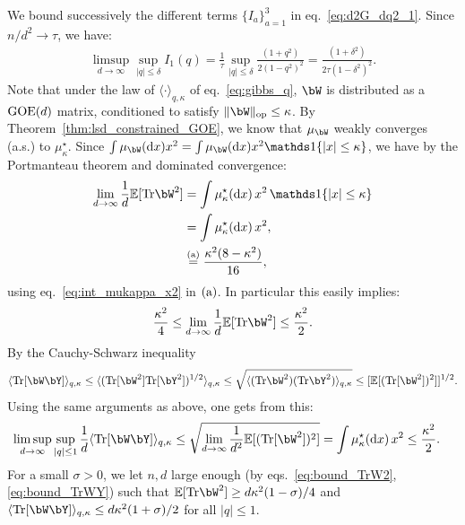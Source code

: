 We bound successively the different terms $\{I_a\}_{a=1}^3$ in eq.~\eqref{eq:d2G_dq2_1}. 
Since $n/d^2 \to \tau$, we have:
\begin{align}\label{eq:ub_I1}
   \limsup_{d \to \infty}\sup_{|q| \leq \delta} I_1(q) = \frac{1}{\tau} \sup_{|q| \leq \delta }\frac{(1+q^2)}{2(1-q^2)^2} 
    = \frac{(1+\delta^2)}{2 \tau(1-\delta^2)^2}.
\end{align}
Note that under the law of $\langle \cdot \rangle_{q,\kappa}$ of eq.~\eqref{eq:gibbs_q},
$\bW$ is distributed as a $\mathrm{GOE}(d)$ matrix, conditioned to satisfy $\|\bW\|_\op \leq \kappa$.
By Theorem~\ref{thm:lsd_constrained_GOE}, we know that $\mu_\bW$ weakly converges (a.s.) to $\mu_\kappa^\star$.
Since $\int \mu_\bW(\rd x) x^2 = \int \mu_\bW(\rd x) x^2 \indi\{|x| \leq \kappa\}$, we have by the Portmanteau theorem 
and dominated convergence: 
\begin{align*}
    \lim_{d \to \infty} \frac{1}{d}\EE[\Tr \bW^2] &= \int \mu_\kappa^\star(\rd x) \, x^2 \, \indi\{|x| \leq \kappa\} \\ 
    &= \int \mu_\kappa^\star(\rd x) \, x^2, \\
    &\aeq \frac{\kappa^2 (8-\kappa^2)}{16},
\end{align*}
using eq.~\eqref{eq:int_mukappa_x2} in $(\rm a)$.
In particular this easily implies: 
\begin{align}\label{eq:bound_TrW2}
   \frac{\kappa^2}{4} \leq \lim_{d \to \infty} \frac{1}{d}\EE[\Tr \bW^2] \leq \frac{\kappa^2}{2}.
\end{align}
By the Cauchy-Schwarz inequality 
\begin{equation*}
\langle \Tr[\bW \bY] \rangle_{q,\kappa} \leq \langle(\Tr[\bW^2] \Tr[\bY^2])^{1/2} \rangle_{q,\kappa}\leq \sqrt{\langle(\Tr \bW^2)(\Tr \bY^2)\rangle_{q,\kappa}} \leq [\EE[(\Tr[\bW^2])^2]]^{1/2}.
\end{equation*}
Using the same arguments as above, one gets from this:
\begin{align}\label{eq:bound_TrWY}
    \limsup_{d \to \infty} \sup_{|q| \leq 1} \frac{1}{d} \langle \Tr[\bW \bY] \rangle_{q,\kappa} \leq \sqrt{\lim_{d \to \infty} \frac{1}{d^2}\EE[(\Tr[\bW^2])^2]} &=\int \mu_\kappa^\star(\rd x) \, x^2 \leq \frac{\kappa^2}{2}.
\end{align}
For a small $\sigma > 0$, we let $n, d$ large enough (by eqs.~\eqref{eq:bound_TrW2},\eqref{eq:bound_TrWY}) such that
$\EE[\Tr\bW^2] \geq d \kappa^2 (1-\sigma) / 4$ 
and $\langle \Tr[\bW \bY] \rangle_{q,\kappa} \leq d \kappa^2 (1+\sigma) / 2$ for all $|q| \leq 1$.
